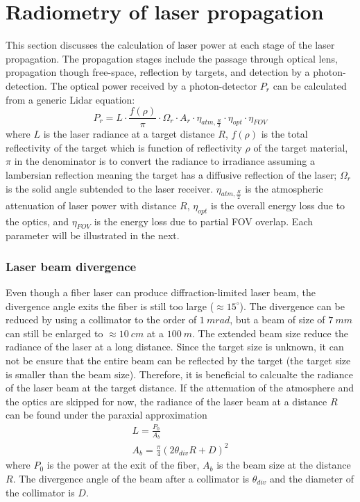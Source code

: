 \section{Radiometry of laser propagation}
This section discusses the calculation of laser power at each stage of the laser propagation. The propagation stages include the passage through optical lens, propagation though free-space, reflection by targets, and detection by a photon-detection. The optical power received by a photon-detector $P_r$ can be calculated from a generic Lidar equation:
\begin{equation} \label{eq:lidareq}
    P_r=L\cdot\frac{f(\rho)}{\pi}\cdot\Omega_r\cdot A_r\cdot\eta_{atm,\frac{R}{2}}\cdot\eta_{opt}\cdot\eta_{FOV}
\end{equation}
where $L$ is the laser radiance at a target distance $R$, $f(\rho)$ is the total reflectivity of the target which is function of reflectivity $\rho$ of the target material, $\pi$ in the denominator is to convert the radiance to irradiance assuming a lambersian reflection meaning the target has a diffusive reflection of the laser; $\Omega_r$ is the solid angle subtended to the laser receiver. $\eta_{atm,\frac{R}{2}}$ is the atmospheric attenuation of laser power with distance $R$, $\eta_{opt}$ is the overall energy loss due to the optics, and $\eta_{FOV}$ is the energy loss due to partial FOV overlap. Each parameter will be illustrated in the next.
\subsubsection{Laser beam divergence}
Even though a fiber laser can produce diffraction-limited laser beam, the divergence angle exits the fiber is still too large ($\approx15^{\circ}$). The divergence can be reduced by using a collimator to the order of $1~mrad$, but a beam of size of $7~mm$ can still be enlarged to $\approx10~cm$ at a $100~m$. The extended beam size reduce the radiance of the laser at a long distance. Since the target size is unknown, it can not be ensure that the entire beam can be reflected by the target (\eg the target size is smaller than the beam size). Therefore, it is beneficial to calcualte the radiance of the laser beam at the target distance. If the attenuation of the atmosphere and the optics are skipped for now, the radiance of the laser beam at a distance $R$ can be found under the paraxial approximation
\begin{eqnarray}
    L=\frac{P_0}{A_b}\\
    A_b=\frac{\pi}{4}(2\theta_{div}R+D)^2
\end{eqnarray}
where $P_0$ is the power at the exit of the fiber, $A_b$ is the beam size at the distance $R$. The divergence angle of the beam after a collimator is $\theta_{div}$ and the diameter of the collimator is $D$.

